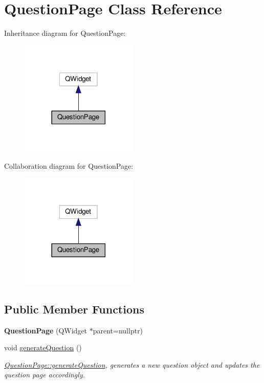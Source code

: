 \hypertarget{classQuestionPage}{}\section{Question\+Page Class Reference}
\label{classQuestionPage}


Inheritance diagram for Question\+Page\+:
\nopagebreak
\begin{figure}[H]
\begin{center}
\leavevmode
\includegraphics[width=158pt]{classQuestionPage__inherit__graph}
\end{center}
\end{figure}


Collaboration diagram for Question\+Page\+:
\nopagebreak
\begin{figure}[H]
\begin{center}
\leavevmode
\includegraphics[width=158pt]{classQuestionPage__coll__graph}
\end{center}
\end{figure}
\subsection*{Public Member Functions}
\begin{DoxyCompactItemize}
\item 
\mbox{\label{classQuestionPage_a0e5942772dea0003205663676b1b667c}} 
{\bfseries Question\+Page} (Q\+Widget $\ast$parent=nullptr)
\item 
\mbox{\label{classQuestionPage_ac2485d12691429ffd6c5a998a1f36865}} 
void \hyperlink{classQuestionPage_ac2485d12691429ffd6c5a998a1f36865}{generate\+Question} ()
\begin{DoxyCompactList}\small\item\em \hyperlink{classQuestionPage_ac2485d12691429ffd6c5a998a1f36865}{Question\+Page\+::generate\+Question}, generates a new question object and updates the question page accordingly. \end{DoxyCompactList}\end{DoxyCompactItemize}
